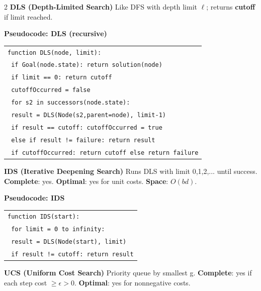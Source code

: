 \documentclass[10pt]{article}
\begin{document}
\begin{multicols*}{2}
\textbf{DLS (Depth-Limited Search)}\newline
Like DFS with depth limit $\ell$; returns \textbf{cutoff} if limit reached.

\textbf{Pseudocode: DLS (recursive)}
\begin{tabular}{@{}l@{}}
\texttt{function DLS(node, limit):}\\
\texttt{ if Goal(node.state): return solution(node)}\\
\texttt{ if limit == 0: return cutoff}\\
\texttt{ cutoffOccurred = false}\\
\texttt{ for s2 in successors(node.state):}\\
\texttt{  result = DLS(Node(s2,parent=node), limit-1)}\\
\texttt{  if result == cutoff: cutoffOccurred = true}\\
\texttt{  else if result != failure: return result}\\
\texttt{ if cutoffOccurred: return cutoff else return failure}
\end{tabular}

\textbf{IDS (Iterative Deepening Search)}\newline
Runs DLS with limit 0,1,2,... until success.\newline
\textbf{Complete}: yes. \textbf{Optimal}: yes for unit costs. \textbf{Space}: $O(bd)$.

\textbf{Pseudocode: IDS}
\begin{tabular}{@{}l@{}}
\texttt{function IDS(start):}\\
\texttt{ for limit = 0 to infinity:}\\
\texttt{  result = DLS(Node(start), limit)}\\
\texttt{  if result != cutoff: return result}
\end{tabular}

\textbf{UCS (Uniform Cost Search)}\newline
Priority queue by smallest g.\newline
\textbf{Complete}: yes if each step cost $\ge \epsilon > 0$. \textbf{Optimal}: yes for nonnegative costs.


\end{multicols*}
\end{document}
